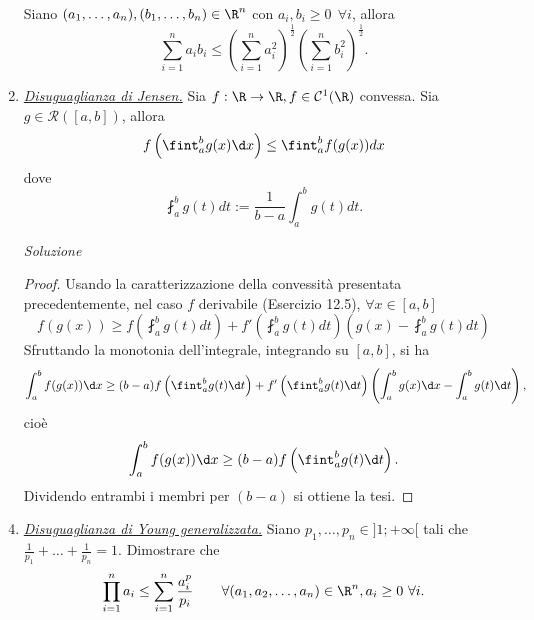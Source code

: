 \documentclass{article}
\begin{document}
\begin{enumerate}[label=\textbf{Esercizio 12.\arabic*.},itemindent=*]
\begin{corollary*}
    Siano $(a_1, \dots, a_n), (b_1,\dots, b_n)\in \R^n$ con $a_i, b_i\geq 0~~\forall i$, allora  
    \[\sum_{i=1}^n a_ib_i\leq \left(\sum_{i=1}^na_i^2\right)^{\frac{1}{2}}\left(\sum_{i=1}^nb_i^2\right)^{\frac{1}{2}}.\]
\end{corollary*}

\item \underline{\textit{Disuguaglianza di Jensen.}} Sia $f:\R\to\R, f\in \mathcal{C}^1(\R)$ convessa. Sia $g\in \mathcal{R}([a,b])$, allora 
\[f\left( \fint_a^b g(x)\d x \right)\leq \fint _a^bf(g(x))dx\] 
dove
\[\fint_a^bg(t)dt:=\frac{1}{b-a}\int _a^bg(t)dt.\]

\item[\textit{\large Soluzione~}]~

\begin{proof}
   Usando la caratterizzazione della convessità presentata precedentemente, nel caso $f$ derivabile (Esercizio 12.5), $\forall x\in [a,b]$
   \[f(g(x))\geq f\left(\fint_a^bg(t)dt\right)+f'\left(\fint_a^bg(t)dt\right)\left( g(x)-\fint _a^bg(t)dt \right)\]
   Sfruttando la monotonia dell'integrale, integrando su $[a,b]$, si ha
   \[\int_a^bf(g(x))\d x\geq (b - a)f\left( \fint_a^bg(t)\d t \right) + f'\left( \fint_a^bg(t)\d t \right) \left( \int_a^bg(x)\d x -  \int_a^bg(t)\d t\right), \]
   cioè 
   \[\int_a^bf(g(x))\d x\geq (b - a)f\left(\fint_a^bg(t)\d t\right).\]
   Dividendo entrambi i membri per $(b-a)$ si ottiene la tesi.
\end{proof}

\item \underline{\textit{Disuguaglianza di Young generalizzata.}} Siano $p_1, \dots, p_n \in ]1;+\infty[$ tali che $\frac{1}{p_1}+\dots+\frac{1}{p_n}=1$. Dimostrare che 
\[\prod_{i=1}^na_i\leq \sum_{i=1}^n\frac{a_i^p}{p_i}\qquad \forall (a_1, a_2, \dots, a_n)\in \R^n, a_i\geq 0~\forall i.\]


\end{enumerate}
\end{document}
